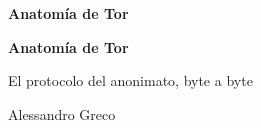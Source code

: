\documentclass[11pt,openright,twoside]{book}
\begin{document}
\frontmatter
\thispagestyle{empty}
\null\vfill
\begin{center}{\LARGE\bfseries Anatomía de Tor\par}\end{center}
\vfill\vfill
\cleardoublepage
\thispagestyle{empty}
\begin{center}
\vspace*{2.5cm}
{\Huge\bfseries Anatomía de Tor\par}
\vspace{0.9cm}
{\Large El protocolo del anonimato, byte a byte\par}
\vspace{3.5cm}
{\Large Alessandro Greco\par}
\vfill
\end{center}
\clearpage
\thispagestyle{empty}
\null\vfill
\Colophon
\cleardoublepage
\tableofcontents

\mainmatter

\backmatter
\printbibliography[heading=bibintoc,title={Bibliografía}]
\printindex
\end{document}
